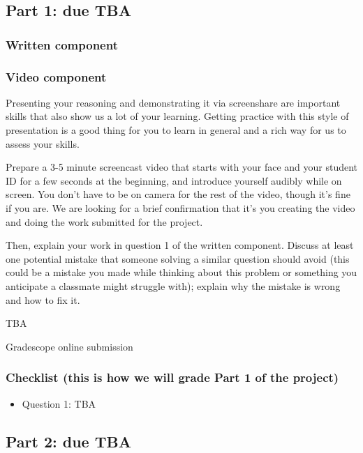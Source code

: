 \documentclass[12pt, oneside]{article}
\begin{document}
\newpage
\subsection*{Part 1: due TBA}
\subsubsection*{Written component}


\subsubsection*{Video component}
Presenting your reasoning and demonstrating it via screenshare are important 
skills that also show us a lot of your learning. Getting practice with this style of 
presentation is a good thing for you to learn in general and a rich way for us to assess your skills. 

Prepare a 3-5 minute screencast video that starts with 
your face and your student ID for a few seconds at the beginning, and introduce yourself audibly while on screen. 
You don't have to be on camera for the rest of the video, though it's fine if you are. 
We are looking for a brief confirmation that it's you creating the video and doing the work 
submitted for the project.

Then, explain your work in question 1 of the written component.
Discuss at least one potential mistake that someone solving 
a similar question should avoid (this could be a mistake you made while thinking about this 
problem or something you anticipate a classmate might struggle with); explain why the 
mistake is wrong and how to fix it.
 
TBA

Gradescope online submission

\subsubsection*{Checklist (this is how we will grade Part 1 of the project)}
\begin{itemize}
\item Question 1: TBA
\end{itemize}

\newpage
\subsection*{Part 2: due TBA}
\end{document}
